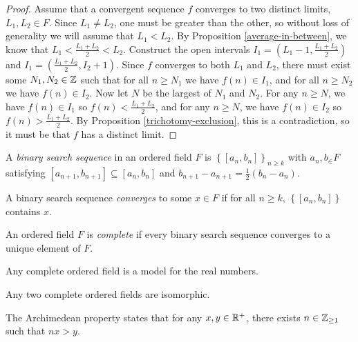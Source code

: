 \begin{proof}
    Assume that a convergent sequence $f$ converges to two distinct limits, $L_1, L_2 \in F$. Since $L_1 \neq L_2$, one must be greater than the other, so without loss of generality we will assume that $L_1 < L_2$. By Proposition \ref{average-in-between}, we know that $L_1 < \frac{L_1+L_2}{2} < L_2$. Construct the open intervals $I_1 = (L_1 - 1, \frac{L_1+L_2}{2})$ and $I_1 = (\frac{L_1+L_2}{2}, I_2 + 1)$. Since $f$ converges to both $L_1$ and $L_2$, there must exist some $N_1, N_2 \in \mathbb{Z}$ such that for all $n \geq N_1$ we have $f(n) \in I_1$, and for all $n \geq N_2$ we have $f(n) \in I_2$. Now let $N$ be the largest of $N_1$ and $N_2$. For any $n \geq N$, we have $f(n) \in I_1$ so $f(n) < \frac{L_1+L_2}{2}$, and for any $n \geq N$, we have $f(n) \in I_2$ so $f(n) > \frac{L_1+L_2}{2}$. By Proposition \ref{trichotomy-exclusion}, this is a contradiction, so it must be that $f$ has a distinct limit.
\end{proof}

\begin{defn}
    A \emph{binary search sequence} in an ordered field $F$ is $\left\{[a_n, b_n]\right\}_{n \geq k}$ with $a_n, b_ \in F$ satisfying $[a_{n+1}, b_{n+1}] \subseteq [a_n, b_n]$ and $b_{n+1}-a_{n+1} = \frac{1}{2}(b_n - a_n)$.
\end{defn}

\begin{defn}
    A binary search sequence \emph{converges} to some $x \in F$ if for all $n \geq k$, $\left\{[a_n, b_n]\right\}$ contains $x$.
\end{defn}

\begin{defn}
    An ordered field $F$ is \emph{complete} if every binary search sequence converges to a unique element of $F$.
\end{defn}

\begin{defn}
    Any complete ordered field is a model for the real numbers.
\end{defn}

\begin{rmk}
    Any two complete ordered fields are isomorphic.
\end{rmk}

\begin{thm}\label{archimedean-property}
    The Archimedean property states that for any $x, y \in \mathbb{R}^{+}$, there exists $n \in \mathbb{Z}_{\geq 1}$ such that $nx > y$.
\end{thm}

